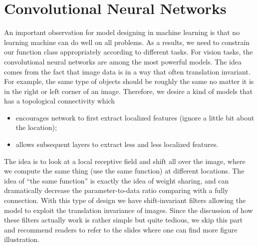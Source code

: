 \documentclass[../book-template.tex]{subfiles}
\begin{document}
\section{Convolutional Neural Networks}
An important observation for model designing in machine learning is that no learning machine can do well on all problems. As a results, we need to constrain our function class appropriately according to different tasks. For vision tasks, the convolutional neural networks are among the most powerful models. The idea comes from the fact that image data is in a way that often translation invariant. For example, the same type of objects should be roughly the same no matter it is in the right or left corner of an image. Therefore, we desire a kind of models that has a topological connectivity which
\begin{itemize}
	\item encourages network to first extract localized features (ignore a little bit about the location);
	\item allows subsequent layers to extract less and less localized features.
\end{itemize}
The idea is to look at a local receptive field and shift all over the image, where we compute the same thing (use the same function) at different locations. The idea of ``the same function'' is exactly the idea of weight sharing, and can dramatically decrease the parameter-to-data ratio comparing with a fully connection. With this type of design we have shift-invariant filters allowing the model to exploit the translation invariance of images. Since the discussion of how these filters actually work is rather simple but quite tedious, we skip this part and recommend readers to refer to the slides where one can find more figure illustration.
\end{document}
